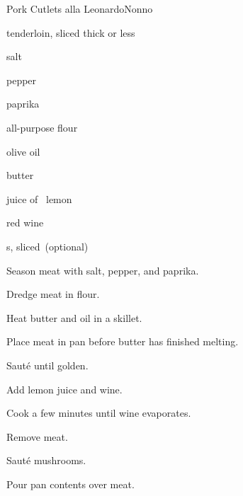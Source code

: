 \begin{recipe}{Pork Cutlets alla Leonardo}{Nonno}{}

\begin{ingredients}
\item {} tenderloin, sliced \inch{\quarter} thick or less
\item salt
\item pepper
\item paprika
\item all-purpose flour
\item olive oil
\item {} butter
\item juice of \half{}~lemon
\item \C{\half} red wine
\item {}s, sliced~(optional)
\end{ingredients}

\begin{directions}
\item Season meat with salt, pepper, and paprika.
\item Dredge meat in flour.
\item Heat butter and oil in a skillet.
\item Place meat in pan before butter has finished melting.
\item Sauté until golden.
\item Add lemon juice and wine.
\item Cook a few minutes until wine evaporates.
\item Remove meat.
\item Sauté mushrooms.
\item Pour pan contents over meat.
\end{directions}

\end{recipe}
